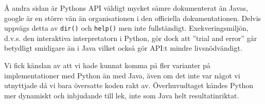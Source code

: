 \documentclass[a4paper, twoside, 11pt]{article}
\begin{document}
Å andra sidan är Pythons API väldigt mycket sämre dokumenterat än Javas, google är en större vän än organisationen i den officiella dokumentationen. Delvis uppvägs detta av \verb|dir()| och \verb|help()| men inte fullständigt. Exekveringsmiljön, d.v.s. den interaktiva interpretatorn i Python, gör dock att ''trial and error'' går betydligt smidigare än i Java vilket också gör API:t mindre livsnödvändigt. 

Vi fick känslan av att vi hade kunnat komma på fler varianter på implementationer med Python än med Java, även om det inte var något vi utnyttjade då vi bara översatte koden rakt av. Överhuvudtaget kändes Python mer dynamiskt och inbjudande till lek, inte som Java helt resultatinriktat.
\end{document}
